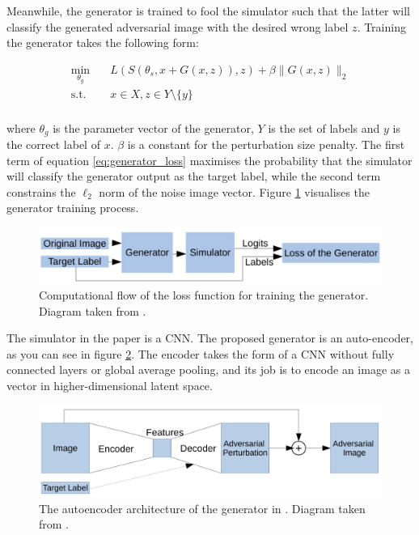 Meanwhile, the generator is trained to fool the simulator such that the latter will classify the generated adversarial image with the desired wrong label $z$. Training the generator takes the following form:

\begin{equation}
\begin{aligned}
\min_{\theta_g} \quad & L(S(\theta_s, x + G(x, z)),z) + \beta\|G(x,z)\|_2\\
\textrm{s.t.} \quad & x \in X, z \in Y \setminus \{y\}\\
\label{eq:generator_loss}
\end{aligned}
\end{equation}

\noindent where $\theta_g$ is the parameter vector of the generator, $Y$ is the set of labels and $y$ is the correct label of $x$. $\beta$ is a constant for the perturbation size penalty. The first term of equation \ref{eq:generator_loss} maximises the probability that the simulator will classify the generator output as the target label, while the second term constrains the $\ell_2$ norm of the noise image vector.  Figure \ref{fig:zheng_generator_loss} visualises the generator training process.

\begin{figure}[ht]
    \centering
    \includegraphics[width=1\textwidth]{graphics/generator_loss.JPG}
    \caption{Computational flow of the loss function for training the generator. Diagram taken from \cite{zheng_black_box_GAN}.}
    \label{fig:zheng_generator_loss}
\end{figure}

The simulator in the paper is a CNN. The proposed generator is an auto-encoder, as you can see in figure \ref{fig:zheng_generator}. The encoder takes the form of a CNN without fully connected layers or global average pooling, and its job is to encode an image as a vector in higher-dimensional latent space. 

\begin{figure}[ht]
    \centering
    \includegraphics[width=1\textwidth]{graphics/generator.JPG}
    \caption{The autoencoder architecture of the generator in \cite{zheng_black_box_GAN}. Diagram taken from \cite{zheng_black_box_GAN}.}
    \label{fig:zheng_generator}
\end{figure}

